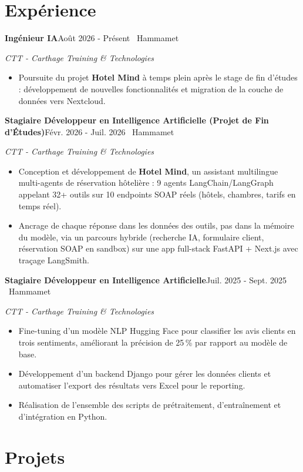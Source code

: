 \documentclass[11pt,a4paper]{article}
\newcommand{\entry}[2]{\textbf{#1}\hfill{\small\color{muted}#2}\par}
\newcommand{\org}[1]{{\itshape\color{muted}#1}\par}
\begin{document}
\section{Expérience}
\entry{Ingénieur IA}{Août 2026 - Présent \textperiodcentered\ Hammamet}
\org{CTT - Carthage Training \& Technologies}
\begin{itemize}
  \item Poursuite du projet \textbf{Hotel Mind} à temps plein après le stage de fin d'études : développement de nouvelles fonctionnalités et migration de la couche de données vers Nextcloud.
\end{itemize}
\vspace{2pt}
\entry{Stagiaire Développeur en Intelligence Artificielle (Projet de Fin d'Études)}{Févr. 2026 - Juil. 2026 \textperiodcentered\ Hammamet}
\org{CTT - Carthage Training \& Technologies}
\begin{itemize}
  \item Conception et développement de \textbf{Hotel Mind}, un assistant multilingue multi-agents de réservation hôtelière : 9 agents LangChain/LangGraph appelant 32+ outils sur 10 endpoints SOAP réels (hôtels, chambres, tarifs en temps réel).
  \item Ancrage de chaque réponse dans les données des outils, pas dans la mémoire du modèle, via un parcours hybride (recherche IA, formulaire client, réservation SOAP en sandbox) sur une app full-stack FastAPI + Next.js avec traçage LangSmith.
\end{itemize}
\vspace{2pt}
\entry{Stagiaire Développeur en Intelligence Artificielle}{Juil. 2025 - Sept. 2025 \textperiodcentered\ Hammamet}
\org{CTT - Carthage Training \& Technologies}
\begin{itemize}
  \item Fine-tuning d'un modèle NLP Hugging Face pour classifier les avis clients en trois sentiments, améliorant la précision de 25\,\% par rapport au modèle de base.
  \item Développement d'un backend Django pour gérer les données clients et automatiser l'export des résultats vers Excel pour le reporting.
  \item Réalisation de l'ensemble des scripts de prétraitement, d'entraînement et d'intégration en Python.
\end{itemize}

\section{Projets}
\end{document}
